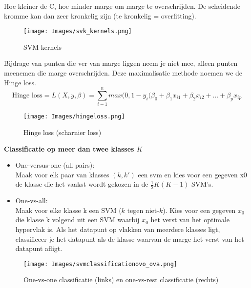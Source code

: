{\noindent
Hoe kleiner de C, hoe minder marge om marge te overschrijden. De scheidende kromme kan dan zeer kronkelig zijn (te kronkelig = overfitting).
\begin{figure}[h]
    \centering
    \texttt{[image: Images/svk\_kernels.png]}
    \caption{SVM kernels}
    \label{fig:pca2}
\end{figure}
\newpage
\noindent Bijdrage van punten die ver van marge liggen neem je niet mee, alleen punten meenemen die marge overschrijden. Deze maximalisatie methode noemen we de Hinge loss.
\[
\textrm{Hinge loss}=L(X,y,\beta)=\sum\limits_{i-1}^nmax(0,1-y_i(\beta_0+\beta_1x_{i1}+\beta_2x_{i2}+...+\beta_px_{ip}
\]
\begin{figure}[h]
    \centering
    \texttt{[image: Images/hingeloss.png]}
    \caption{Hinge loss (scharnier loss)}
    \label{fig:hinge}
\end{figure}
\newpage
\textbf{Classificatie op meer dan twee klasses $K$}
\begin{itemize}
    \item One-versus-one (all pairs):\\
Maak voor elk paar van klasses $(k, k')$ een svm en kies voor
een gegeven x0 de klasse die het vaakst wordt gekozen in
de $\frac{1}{2} K(K-1)$ SVM’s.
\item One-vs-all: \\Maak voor elke klasse k een SVM ($k$ tegen niet-$k$). Kies voor
een gegeven $x_0$ die klasse k volgend uit een SVM waarbij
$x_0$ het verst van het optimale hypervlak is. Als het datapunt op vlakken van meerdere klasses ligt, classificeer je het datapunt als de klasse waarvan de marge het verst van het datapunt afligt.
\end{itemize}
\begin{figure}[h]
    \centering
    \texttt{[image: Images/svmclassificationovo\_ova.png]}
    \caption{One-vs-one classificatie (links) en one-vs-rest classificatie (rechts)}
    \label{fig:svmclass}
\end{figure}

}
